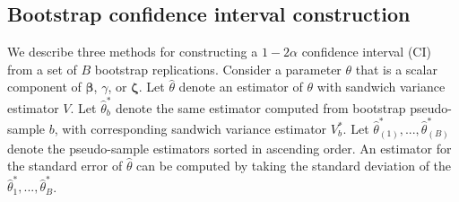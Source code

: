 \documentclass[
  american,
  man, donotrepeattitle,floatsintext]{apa7}
\begin{document}
\subsection*{Bootstrap confidence interval construction}\label{bootstrap-confidence-interval-construction}

We describe three methods for constructing a \(1 - 2\alpha\) confidence interval (CI) from a set of \(B\) bootstrap replications.
Consider a parameter \(\theta\) that is a scalar component of \(\boldsymbol\beta\), \(\gamma\), or \(\boldsymbol\zeta\).
Let \(\hat\theta\) denote an estimator of \(\theta\) with sandwich variance estimator \(V\).
Let \(\hat\theta^*_{b}\) denote the same estimator computed from bootstrap pseudo-sample \(b\), with corresponding sandwich variance estimator \(V^*_{b}\).
Let \(\hat\theta^*_{(1)},...,\hat\theta^*_{(B)}\) denote the pseudo-sample estimators sorted in ascending order.
An estimator for the standard error of \(\hat\theta\) can be computed by taking the standard deviation of the \(\hat\theta^*_1,...,\hat\theta^*_{B}\).
\end{document}
